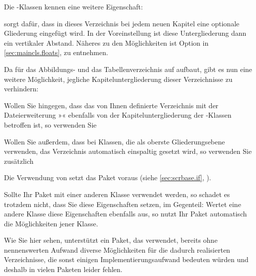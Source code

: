 Die \KOMAScript-Klassen kennen eine weitere Eigenschaft:
\begin{description}
\item[\PValue{chapteratlist}] sorgt dafür, dass in dieses Verzeichnis bei
  jedem neuen Kapitel eine optionale Gliederung eingefügt wird. In der
  Voreinstellung ist diese Untergliederung dann ein vertikaler
  Abstand. Näheres zu den Möglichkeiten ist Option
   in
  \autoref{sec:maincls.floats},  zu
  entnehmen.
\end{description}
\begin{Example}
  Da \KOMAScript{} für das Abbildungs- und das Tabellenverzeichnis auf
   aufbaut, gibt es nun eine weitere Möglichkeit, jegliche
  Kapiteluntergliederung dieser Verzeichnisse zu verhindern:
\begin{lstcode}
\end{lstcode}

  Wollen Sie hingegen, dass das von Ihnen definierte Verzeichnis mit der
  Dateierweiterung »« ebenfalls von der Kapiteluntergliederung der
  \KOMAScript-Klassen betroffen ist, so verwenden Sie
\begin{lstcode}
\end{lstcode}
Wollen Sie außerdem, dass bei Klassen, die  als
oberste Gliederungsebene verwenden, das Verzeichnis automatisch einspaltig
gesetzt wird, so verwenden Sie zusätzlich
\begin{lstcode}
\end{lstcode}
  Die Verwendung von 
  setzt das Paket  voraus (siehe
  \autoref{sec:scrbase.if},
  ).

  Sollte Ihr Paket mit einer anderen Klasse verwendet werden,
  so schadet es trotzdem nicht, dass Sie diese Eigenschaften setzen, im
  Gegenteil: Wertet eine andere Klasse diese Eigenschaften ebenfalls aus, so
  nutzt Ihr Paket automatisch die Möglichkeiten jener Klasse.
\end{Example}
Wie Sie hier sehen, unterstützt ein Paket, das  verwendet,
bereits ohne nennenswerten Aufwand diverse Möglichkeiten für die dadurch
realisierten Verzeichnisse, die sonst einigen Implementierungsaufwand
bedeuten würden und deshalb in vielen Paketen leider fehlen.%
\EndIndexGroup


